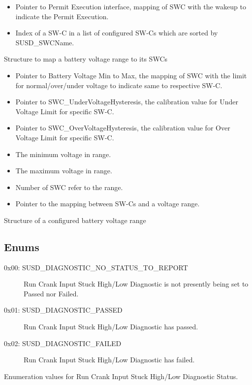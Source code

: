 {\begin{itemize}
\item Pointer to Permit Execution interface, mapping of SWC with the wakeup to indicate the Permit Execution.
\item Index of a SW-C in a list of configured SW-Cs which are sorted by SUSD_SWCName.
\end{itemize}}
{Structure to map a battery voltage range to its SWCs}

{\begin{itemize}
\item Pointer to Battery Voltage Min to Max, the mapping of SWC with the limit for normal/over/under voltage to indicate same to respective SW-C.
\item Pointer to SWC_UnderVoltageHysteresis, the calibration value for Under Voltage Limit for specific SW-C.
\item Pointer to SWC_OverVoltageHysteresis, the calibration value for Over Voltage Limit for specific SW-C.
\item The minimum voltage in range.
\item The maximum voltage in range.
\item Number of SWC refer to the range.
\item Pointer to the mapping between SW-Cs and a voltage range.
\end{itemize}}
{Structure of a configured battery voltage range}


\subsection{Enums}

{
{\begin{description}
\item[0x00: SUSD_DIAGNOSTIC_NO_STATUS_TO_REPORT] Run Crank Input Stuck High/Low Diagnostic is not presently being set to Passed nor Failed.
\item[0x01: SUSD_DIAGNOSTIC_PASSED] Run Crank Input Stuck High/Low Diagnostic has passed.
\item[0x02: SUSD_DIAGNOSTIC_FAILED] Run Crank Input Stuck High/Low Diagnostic has failed.
\end{description}}
{Enumeration values for Run Crank Input Stuck High/Low Diagnostic Status.}}
{  }

